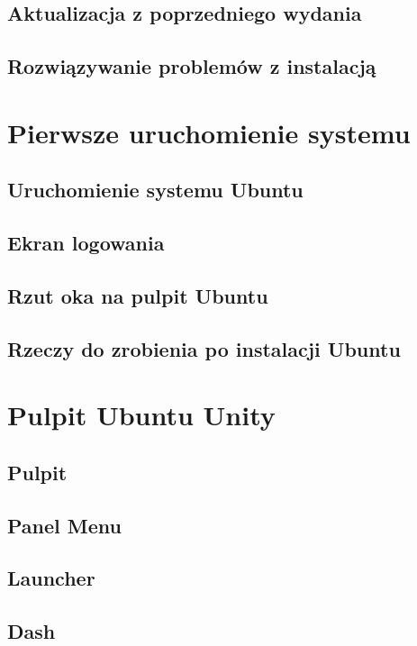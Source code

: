 \documentclass[a4paper,11pt,oneside,draft]{mwart}
\begin{document}
		\subsection{Aktualizacja z poprzedniego wydania}
		\subsection{Rozwiązywanie problemów z instalacją}
			 
	\section{Pierwsze uruchomienie systemu}
		\subsection{Uruchomienie systemu Ubuntu}
			
		\subsection{Ekran logowania}
			
		\subsection{Rzut oka na pulpit Ubuntu}
			
		\subsection{Rzeczy do zrobienia po instalacji Ubuntu}
			
	\section{Pulpit Ubuntu Unity}
	\label{pulpit_unity}
		\subsection{Pulpit}
			 
		\subsection{Panel Menu}
			
		\subsection{Launcher}
			
		\subsection{Dash}
			
\end{document}
